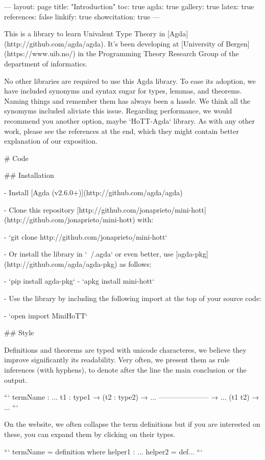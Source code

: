 ---
layout: page
title: "Introduction"
toc: true
agda: true
gallery: true
latex: true
references: false
linkify: true
showcitation: true
---

This is a library to learn Univalent Type Theory in [Agda](http://github.com/agda/agda).
It's been developing at [University of Bergen](https://www.uib.no/) in the Programming Theory Research Group
of the department of informatics.

No other libraries are required to use this Agda library. To ease its adoption, we have included synonyms
and syntax sugar for types, lemmas, and theorems. Naming things and remember them has always been a hassle.
We think all the synomyms included aliviate this issue. Regarding performance, we would recommend you another option, maybe
`HoTT-Agda` library. As with any other work, please see the references at the end, which they
might contain better explanation of our exposition.

# Code

## Installation

- Install [Agda (v2.6.0+)](http://github.com/agda/agda)

- Clone this repository [http://github.com/jonaprieto/mini-hott](http://github.com/jonaprieto/mini-hott) with:

  - `git clone http://github.com/jonaprieto/mini-hott`

- Or install the library in `~/.agda` or even better, use [agda-pkg](http://github.com/agda/agda-pkg)
as follows:

  - `pip install agda-pkg`
  - `apkg install mini-hott`

- Use the library by including the following import at the top of your source code:

    - `open import MiniHoTT`

## Style

Definitions and theorems are typed with unicode characteres, we believe they
improve significantly its readability. Very often, we present them as rule
inferences (with hyphens), to denote after the line the main conclusion or the output.

```
termName
  :  {...} {t1 : type1}
  → (t2 : type2)
  → ...
  ---------------------
  → ... (t1 t2) → ... 
```

On the website, we often collapse the term definitions but if you are interested on these,
you can expand them by clicking on their types.

``` 
termName = definition
  where
  helper1 : ...
  helper2 = def...
```  

